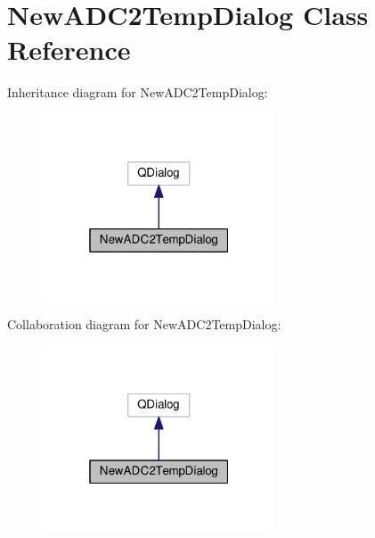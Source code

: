 \hypertarget{class_new_a_d_c2_temp_dialog}{}\section{New\+A\+D\+C2\+Temp\+Dialog Class Reference}
\label{class_new_a_d_c2_temp_dialog}


Inheritance diagram for New\+A\+D\+C2\+Temp\+Dialog\+:\nopagebreak
\begin{figure}[H]
\begin{center}
\leavevmode
\includegraphics[width=196pt]{class_new_a_d_c2_temp_dialog__inherit__graph}
\end{center}
\end{figure}


Collaboration diagram for New\+A\+D\+C2\+Temp\+Dialog\+:\nopagebreak
\begin{figure}[H]
\begin{center}
\leavevmode
\includegraphics[width=196pt]{class_new_a_d_c2_temp_dialog__coll__graph}
\end{center}
\end{figure}
